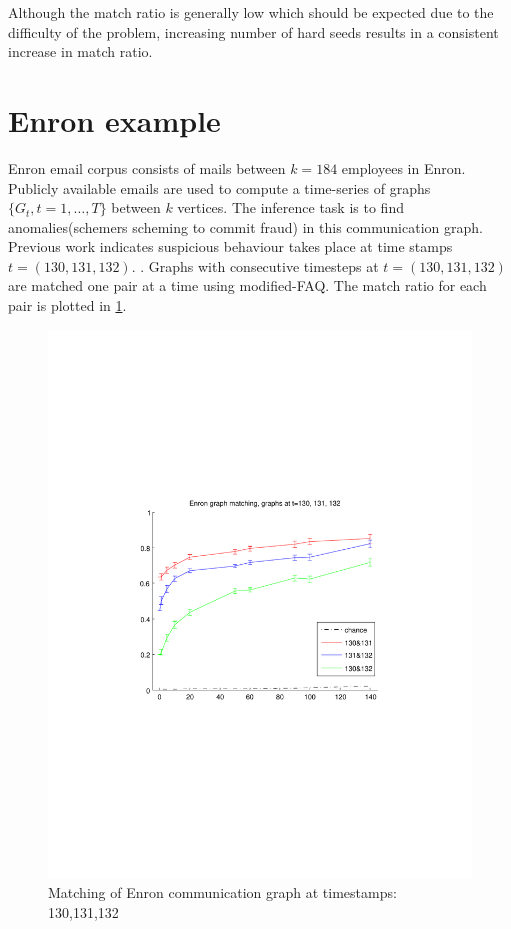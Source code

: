 \documentclass[12pt]{article}
\begin{document}
Although the match ratio is generally low which should be expected due to the difficulty of the problem, increasing number of hard seeds results in a consistent increase in match ratio.

\section{Enron example \label{enron}}
Enron email corpus consists of mails between $k=184$ employees in Enron. Publicly available emails are used to compute a time-series of graphs $\{G_t, t=1,\ldots,T\}$ between $k$ vertices. The inference task is to find anomalies(schemers scheming to commit fraud) in this communication graph.    
Previous work \cite{} indicates suspicious behaviour takes place at time stamps $t=(130,131,132)$. .  Graphs with consecutive  timesteps at $t=(130,131,132)$ are matched one pair at a time using modified-FAQ. The match ratio for each pair is plotted in \ref{enron-fig}.

\begin{figure}
\includegraphics[scale=0.8]{enron}
\caption{Matching of Enron communication graph at timestamps: 130,131,132 \label{enron-fig}  }
\end{figure}
\end{document}
